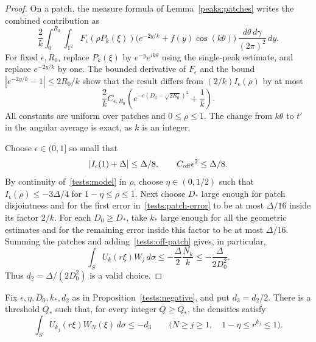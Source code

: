 \begin{proof}
On a patch, the measure formula of Lemma~\ref{peaks:patches} writes
the combined contribution as
\[
 \frac2k\int_0^{R_0}\int_{\mathbb T^2}
 F_\epsilon(\rho P_k(\xi))
       \bigl(e^{-2y/k}+f(y)\cos(k\theta)\bigr)
       \,\frac{d\theta\,d\gamma}{(2\pi)^2}\,dy.
\]
For fixed $\epsilon,R_0$, replace $P_k(\xi)$ by
$e^{-y}e^{ik\theta}$ using the single-peak estimate, and replace
$e^{-2y/k}$ by one.  The bounded derivative of $F_\epsilon$ and the
bound $|e^{-2y/k}-1|\le2R_0/k$ show that the result differs from
$(2/k)I_\epsilon(\rho)$ by at most
\begin{equation}\label{tests:patch-error}
 \frac2k C_{\epsilon,R_0}
 \left(e^{-c(D_0-\sqrt{2R_0})^2}+\frac1k\right).
\end{equation}
All constants are uniform over patches and $0\le\rho\le1$.
The change from $k\theta$ to $t'$ in the angular average is exact,
as $k$ is an integer.

Choose $\epsilon\in(0,1]$ so small that
\[
 |I_\epsilon(1)+\Delta|\le\Delta/8,
 \qquad C_{\rm off}\epsilon^2\le\Delta/8.
\]
By continuity of~\eqref{tests:model} in $\rho$, choose
$\eta\in(0,1/2)$ such that
$I_\epsilon(\rho)\le-3\Delta/4$ for $1-\eta\le\rho\le1$.
Next choose $D_*$ large enough for patch disjointness and for the
first error in~\eqref{tests:patch-error} to be at most $\Delta/16$
inside its factor $2/k$.  For each $D_0\ge D_*$, take $k_*$ large
enough for all the geometric estimates and for the remaining error
inside this factor to be at most $\Delta/16$.
Summing the patches and adding~\eqref{tests:off-patch} gives, in
particular,
\[
 \int_S U_k(r\xi)W_j\,d\sigma
 \le-\frac{\Delta}{2}\frac{N_k}{k}
 \le-\frac{\Delta}{2D_0^2}.
\]
Thus $d_2=\Delta/(2D_0^2)$ is a valid choice.
\end{proof}

\begin{lemma}\label{tests:later}
Fix $\epsilon,\eta,D_0,k_*,d_2$ as in
Proposition~\ref{tests:negative}, and put $d_3=d_2/2$.
There is a threshold $Q_*$ such that, for every integer $Q\ge Q_*$,
the densities satisfy
\begin{equation}\label{tests:later-negative}
 \int_S U_{k_j}(r\xi)W_N(\xi)\,d\sigma\le-d_3
 \qquad
 \bigl(N\ge j\ge1,\quad1-\eta\le r^{k_j}\le1\bigr).
\end{equation}
\end{lemma}

